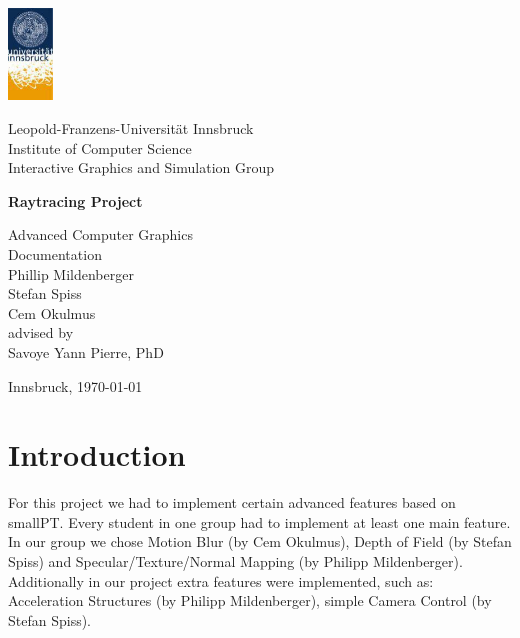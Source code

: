 \documentclass[11pt,a4paper]{article}
\begin{document}

\begin{titlepage} %

\begin{center}
\includegraphics[width=1.2cm]{images/uibk}

\begin{large}
Leopold-Franzens-Universität Innsbruck\\[5mm]
Institute of Computer Science\\
Interactive Graphics and Simulation Group\\[25mm]
\end{large}

{\LARGE \bf Raytracing Project}

Advanced Computer Graphics\\ 
Documentation\\[15mm]

Phillip Mildenberger\\
Stefan Spiss\\
Cem Okulmus\\[35mm]

advised by\\
Savoye Yann Pierre, PhD\\[10mm]

\vfill

Innsbruck, \today
\end{center}

\end{titlepage}



\section{Introduction}
\label{sec:intro}

For this project we had to implement certain advanced features based on smallPT. Every student in one group had to implement at least one main feature. In our group we chose Motion Blur (by Cem Okulmus), Depth of Field (by Stefan Spiss) and Specular/Texture/Normal Mapping (by Philipp Mildenberger). Additionally in our project extra features were implemented, such as: Acceleration Structures (by Philipp Mildenberger), simple Camera Control (by Stefan Spiss).
\end{document}
